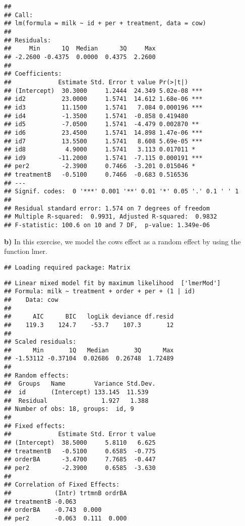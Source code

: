 \documentclass[]{article}
\begin{document}
\begin{verbatim}
## 
## Call:
## lm(formula = milk ~ id + per + treatment, data = cow)
## 
## Residuals:
##     Min      1Q  Median      3Q     Max 
## -2.2600 -0.4375  0.0000  0.4375  2.2600 
## 
## Coefficients:
##             Estimate Std. Error t value Pr(>|t|)    
## (Intercept)  30.3000     1.2444  24.349 5.02e-08 ***
## id2          23.0000     1.5741  14.612 1.68e-06 ***
## id3          11.1500     1.5741   7.084 0.000196 ***
## id4          -1.3500     1.5741  -0.858 0.419480    
## id5          -7.0500     1.5741  -4.479 0.002870 ** 
## id6          23.4500     1.5741  14.898 1.47e-06 ***
## id7          13.5500     1.5741   8.608 5.69e-05 ***
## id8           4.9000     1.5741   3.113 0.017011 *  
## id9         -11.2000     1.5741  -7.115 0.000191 ***
## per2         -2.3900     0.7466  -3.201 0.015046 *  
## treatmentB   -0.5100     0.7466  -0.683 0.516536    
## ---
## Signif. codes:  0 '***' 0.001 '**' 0.01 '*' 0.05 '.' 0.1 ' ' 1
## 
## Residual standard error: 1.574 on 7 degrees of freedom
## Multiple R-squared:  0.9931, Adjusted R-squared:  0.9832 
## F-statistic: 100.6 on 10 and 7 DF,  p-value: 1.349e-06
\end{verbatim}

\textbf{b)} In this exercise, we model the cows effect as a random
effect by using the function lmer.

\begin{verbatim}
## Loading required package: Matrix
\end{verbatim}

\begin{verbatim}
## Linear mixed model fit by maximum likelihood  ['lmerMod']
## Formula: milk ~ treatment + order + per + (1 | id)
##    Data: cow
## 
##      AIC      BIC   logLik deviance df.resid 
##    119.3    124.7    -53.7    107.3       12 
## 
## Scaled residuals: 
##      Min       1Q   Median       3Q      Max 
## -1.53112 -0.37104  0.02686  0.26748  1.72489 
## 
## Random effects:
##  Groups   Name        Variance Std.Dev.
##  id       (Intercept) 133.145  11.539  
##  Residual               1.927   1.388  
## Number of obs: 18, groups:  id, 9
## 
## Fixed effects:
##             Estimate Std. Error t value
## (Intercept)  38.5000     5.8110   6.625
## treatmentB   -0.5100     0.6585  -0.775
## orderBA      -3.4700     7.7685  -0.447
## per2         -2.3900     0.6585  -3.630
## 
## Correlation of Fixed Effects:
##            (Intr) trtmnB ordrBA
## treatmentB -0.063              
## orderBA    -0.743  0.000       
## per2       -0.063  0.111  0.000
\end{verbatim}
\end{document}
